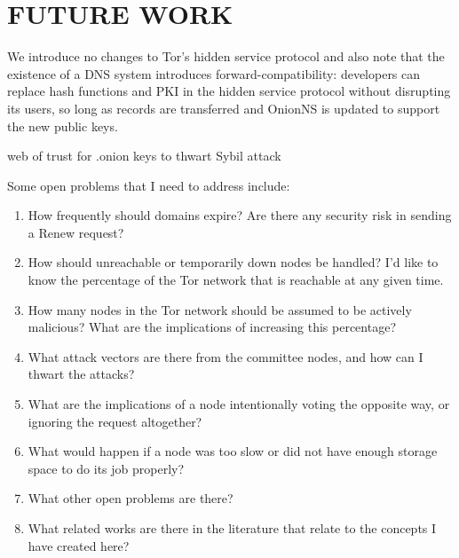 
\chapter{FUTURE WORK}

We introduce no changes to Tor's hidden service protocol and also note that the existence of a DNS system introduces forward-compatibility: developers can replace hash functions and PKI in the hidden service protocol without disrupting its users, so long as records are transferred and OnionNS is updated to support the new public keys.

web of trust for .onion keys to thwart Sybil attack

Some open problems that I need to address include:

\begin{enumerate}
	\item How frequently should domains expire? Are there any security risk in sending a Renew request?
	\item How should unreachable or temporarily down nodes be handled? I'd like to know the percentage of the Tor network that is reachable at any given time.
	\item How many nodes in the Tor network should be assumed to be actively malicious? What are the implications of increasing this percentage?
	\item What attack vectors are there from the committee nodes, and how can I thwart the attacks?
	\item What are the implications of a node intentionally voting the opposite way, or ignoring the request altogether?
	\item What would happen if a node was too slow or did not have enough storage space to do its job properly?
	\item What other open problems are there?
	\item What related works are there in the literature that relate to the concepts I have created here?
\end{enumerate}